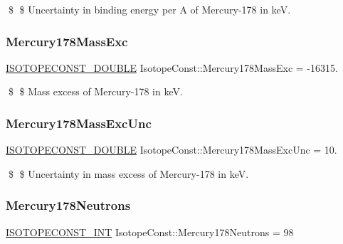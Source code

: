 \$ \$ Uncertainty in binding energy per A of Mercury-\/178 in keV. \mbox{\label{group___isotope_const-_mercury-_hg178_ga009fe41013625d0a1d688c1ab92daabf}} 
\subsubsection{\texorpdfstring{Mercury178\+Mass\+Exc}{Mercury178MassExc}}
{\footnotesize\ttfamily \mbox{\hyperlink{group___isotope_const-_macros_ga8f45a7272ce02c0b4c65c44636ed719a}{I\+S\+O\+T\+O\+P\+E\+C\+O\+N\+S\+T\+\_\+\+D\+O\+U\+B\+LE}} Isotope\+Const\+::\+Mercury178\+Mass\+Exc = -\/16315.}

\$ \$ Mass excess of Mercury-\/178 in keV. \mbox{\label{group___isotope_const-_mercury-_hg178_ga3ec8dd9e3a642931907121931755d6e0}} 
\subsubsection{\texorpdfstring{Mercury178\+Mass\+Exc\+Unc}{Mercury178MassExcUnc}}
{\footnotesize\ttfamily \mbox{\hyperlink{group___isotope_const-_macros_ga8f45a7272ce02c0b4c65c44636ed719a}{I\+S\+O\+T\+O\+P\+E\+C\+O\+N\+S\+T\+\_\+\+D\+O\+U\+B\+LE}} Isotope\+Const\+::\+Mercury178\+Mass\+Exc\+Unc = 10.}

\$ \$ Uncertainty in mass excess of Mercury-\/178 in keV. \mbox{\label{group___isotope_const-_mercury-_hg178_ga0122741cb8f38c65733188a3e6ec1f78}} 
\subsubsection{\texorpdfstring{Mercury178\+Neutrons}{Mercury178Neutrons}}
{\footnotesize\ttfamily \mbox{\hyperlink{group___isotope_const-_macros_ga5f18360b3e99483a35c32d789e62621c}{I\+S\+O\+T\+O\+P\+E\+C\+O\+N\+S\+T\+\_\+\+I\+NT}} Isotope\+Const\+::\+Mercury178\+Neutrons = 98}

